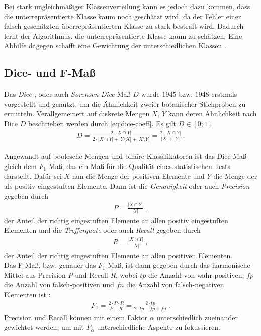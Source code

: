 Bei stark ungleichmäßiger Klassenverteilung kann es jedoch dazu kommen, 
dass die unterrepräsentierte Klasse kaum noch geschätzt wird, 
da der Fehler einer falsch geschätzten überrepräsentierten Klasse zu stark bestraft wird.
Dadurch lernt der Algorithmus, die unterrepräsentierte Klasse kaum zu schätzen.
Eine Abhilfe dagegen schafft eine Gewichtung der unterschiedlichen Klassen \cite{Ronneberger.18052015}.

\subsection{Dice- und F-Maß}

Das \textit{Dice-}, oder auch \textit{Sorensen-Dice-}Maß $D$ wurde 1945 bzw. 1948 erstmals vorgestellt und genutzt, um die Ähnlichkeit zweier botanischer Stichproben zu ermitteln. Verallgemeinert auf diskrete Mengen $X$, $Y$ kann deren Ähnlichkeit nach Dice $D$ beschrieben werden durch \autoref{eq:dice-coeff}. Es gilt $D \in [0; 1]$ \cites{Srenson.1948}{Dice.1945} 
\begin{align}
	\label{eq:dice-coeff} D = \frac{2 \cdot | X \cap Y |}{2 \cdot | X \cap Y | + |Y \setminus X| + |X \setminus Y|} 
	=\frac{2 \cdot | X \cap Y |}{|X| + |Y|} ~.
\end{align} 

Angewandt auf boolesche Mengen und binäre Klassifikatoren ist das Dice-Maß gleich dem $F_1$-Maß, das ein Maß für die Qualität eines statistischen Tests darstellt. Dafür sei $X$ nun die Menge der positiven Elemente und $Y$ die Menge der als positiv eingestuften Elemente. Dann ist die \textit{Genauigkeit} oder auch \textit{Precision} gegeben durch
\begin{align}
	\label{eq:precision} P = \frac{|X \cap Y|}{|Y|}~,
\end{align}
der Anteil der richtig eingestuften Elemente an allen positiv eingestuften Elementen und die \textit{Trefferquote} oder auch \textit{Recall} gegeben durch
\begin{align}
	\label{eq:recall} R = \frac{|X \cap Y|}{|X|}~,
\end{align}
der Anteil der richtig eingestuften Elemente an allen positiven Elementen. \\
Das F-Maß, bzw. genauer das $F_1$-Maß, ist dann gegeben durch das harmonische Mittel aus Precision $P$ und Recall $R$, wobei $tp$ die Anzahl von wahr-positiven, $fp$ die Anzahl von falsch-positiven und $fn$ die Anzahl von falsch-negativen Elementen ist \cite{YutakaSasaki.2007}:
\begin{align}
	\label{eq:f1} F_{1} = \frac{2\cdot P\cdot R}{P + R} = \frac{2\cdot tp}{2 \cdot tp + fp + fn}~.
\end{align}
Precision und Recall können mit einem Faktor $\alpha$ unterschiedlich zueinander gewichtet werden, um mit $F_{\alpha}$ unterschiedliche Aspekte zu fokussieren. 

